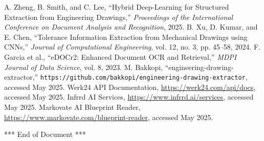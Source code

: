 \documentclass[11pt,a4paper]{article}
\begin{document}
\begin{thebibliography}{9}
 A. Zheng, B. Smith, and C. Lee, “Hybrid Deep-Learning for Structured Extraction from Engineering Drawings,” \textit{Proceedings of the International Conference on Document Analysis and Recognition}, 2025.
 B. Xu, D. Kumar, and E. Chen, “Tolerance Information Extraction from Mechanical Drawings using CNNs,” \textit{Journal of Computational Engineering}, vol. 12, no. 3, pp. 45–58, 2024.
 F. Garcia et al., “eDOCr2: Enhanced Document OCR and Retrieval,” \textit{MDPI Journal of Data Science}, vol. 8, 2023.
 M. Bakkopi, “engineering-drawing-extractor,” \texttt{https://github.com/bakkopi/engineering-drawing-extractor}, accessed May 2025.
 Werk24 API Documentation, \url{https://werk24.com/api/docs}, accessed May 2025.
 Infrrd AI Services, \url{https://www.infrrd.ai/services}, accessed May 2025.
 Markovate AI Blueprint Reader, \url{https://www.markovate.com/blueprint-reader}, accessed May 2025.
\end{thebibliography}

\vfill
\begin{center}
*** End of Document ***
\end{center}
\end{document}
